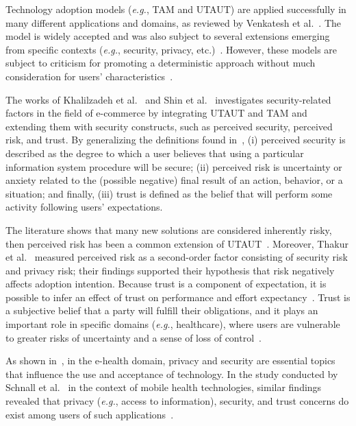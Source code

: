 \vspace{0.00mm}

Technology adoption models ({\it e.g.}, TAM and UTAUT) are applied successfully in many different applications and domains, as reviewed by Venkatesh et al.~\cite{venkatesh2016unified}.
The model is widely accepted and was also subject to several extensions emerging from specific contexts ({\it e.g.}, security, privacy, etc.)~\cite{MCGLYNN201733}.
However, these models are subject to criticism for promoting a deterministic approach without much consideration for users’ characteristics~\cite{https://doi.org/10.1002/mar.20823}.

The works of Khalilzadeh et al.~\cite{KHALILZADEH2017460} and Shin et al.~\cite{SHIN20091343} investigates security-related factors in the field of e-commerce by integrating UTAUT and TAM and extending them with security constructs, such as perceived security, perceived risk, and trust.
By generalizing the definitions found in~\cite{KHALILZADEH2017460, mandrik2005exploring, SHIN20091343}, (i) perceived security is described as the degree to which a user believes that using a particular information system procedure will be secure; (ii) perceived risk is uncertainty or anxiety related to the (possible negative) final result of an action, behavior, or a situation; and finally, (iii) trust is defined as the belief that will perform some activity following users’ expectations.

The literature shows that many new solutions are considered inherently risky, then perceived risk has been a common extension of UTAUT~\cite{KHALILZADEH2017460, https://doi.org/10.1002/mar.20823, williams2011utaut}.
Moreover, Thakur et al.~\cite{Thakur2014} measured perceived risk as a second-order factor consisting of security risk and privacy risk; their findings supported their hypothesis that risk negatively affects adoption intention.
Because trust is a component of expectation, it is possible to infer an effect of trust on performance and effort expectancy~\cite{Lee:2013:0301-2212:587}.
Trust is a subjective belief that a party will fulfill their obligations, and it plays an important role in specific domains ({\it e.g.}, healthcare), where users are vulnerable to greater risks of uncertainty and a sense of loss of control~\cite{LU2011393, ZHOU20131085}.

As shown in~\cite{6038874}, in the e-health domain, privacy and security are essential topics that influence the use and acceptance of technology.
In the study conducted by Schnall et al.~\cite{Schnall2015} in the context of mobile health technologies, similar findings revealed that privacy ({\it e.g.}, access to information), security, and trust concerns do exist among users of such applications~\cite{10.1145/3132272.3134111}.

